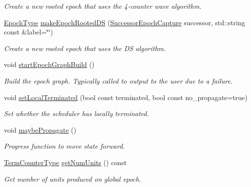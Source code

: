\begin{DoxyCompactItemize}
\begin{DoxyCompactList}\small\item\em Create a new rooted epoch that uses the 4-\/counter wave algorithm. \end{DoxyCompactList}\item 
\hyperlink{namespacevt_a985a5adf291c34a3ca263b3378388236}{Epoch\+Type} \hyperlink{structvt_1_1term_1_1_termination_detector_ace8e32a81e88bd714ee6d7011bf1c7eb}{make\+Epoch\+Rooted\+DS} (\hyperlink{structvt_1_1term_1_1_successor_epoch_capture}{Successor\+Epoch\+Capture} successor, std\+::string const \&label=\char`\"{}\char`\"{})
\begin{DoxyCompactList}\small\item\em Create a new rooted epoch that uses the DS algorithm. \end{DoxyCompactList}\item 
void \hyperlink{structvt_1_1term_1_1_termination_detector_a782a54afd99943982ce455416828ea66}{start\+Epoch\+Graph\+Build} ()
\begin{DoxyCompactList}\small\item\em Build the epoch graph. Typically called to output to the user due to a failure. \end{DoxyCompactList}\item 
void \hyperlink{structvt_1_1term_1_1_termination_detector_acb639c048af01c8d67c82db0227888a4}{set\+Local\+Terminated} (bool const terminated, bool const no\+\_\+propagate=true)
\begin{DoxyCompactList}\small\item\em Set whether the scheduler has locally terminated. \end{DoxyCompactList}\item 
void \hyperlink{structvt_1_1term_1_1_termination_detector_a4a54157fff0152b531b26c4a18393049}{maybe\+Propagate} ()
\begin{DoxyCompactList}\small\item\em Progress function to move state forward. \end{DoxyCompactList}\item 
\hyperlink{namespacevt_1_1term_a4fd378cdb0c36683afc1b3399d685f7f}{Term\+Counter\+Type} \hyperlink{structvt_1_1term_1_1_termination_detector_aa5802cb6f199f3359b1a85058102220c}{get\+Num\+Units} () const
\begin{DoxyCompactList}\small\item\em Get number of units produced on global epoch. \end{DoxyCompactList}\item 

\end{DoxyCompactItemize}
